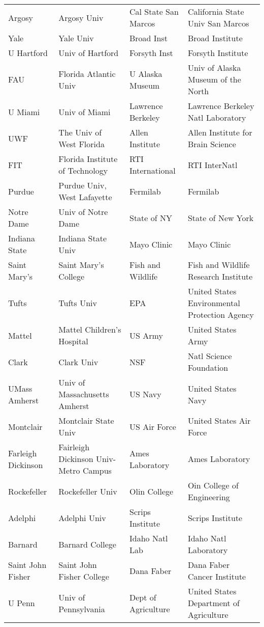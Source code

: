 \documentclass[12pt]{article} %
\begin{document}
\begin{table}[ht]
\begin{adjustwidth}{-2cm}{}
\begin{tabular}{llll}
  Argosy & Argosy Univ & Cal State San Marcos & California State Univ San Marcos \\
  Yale & Yale Univ & Broad Inst & Broad Institute \\
  U Hartford & Univ of Hartford & Forsyth Inst & Forsyth Institute \\
  FAU & Florida Atlantic Univ & U Alaska Museum & Univ of Alaska Museum of the North \\
  U Miami & Univ of Miami & Lawrence Berkeley & Lawrence Berkeley Natl Laboratory \\
  UWF & The Univ of West Florida & Allen Institute & Allen Institute for Brain Science \\
  FIT & Florida Institute of Technology & RTI International & RTI InterNatl \\
  Purdue & Purdue Univ, West Lafayette & Fermilab & Fermilab \\
  Notre Dame & Univ of Notre Dame & State of NY & State of New York \\
  Indiana State & Indiana State Univ & Mayo Clinic & Mayo Clinic \\
  Saint Mary's & Saint Mary's College & Fish and Wildlife & Fish and Wildlife Research Institute \\
  Tufts & Tufts Univ & EPA & United States Environmental Protection Agency \\
  Mattel & Mattel Children's Hospital & US Army & United States Army \\
  Clark & Clark Univ & NSF & Natl Science Foundation \\
  UMass Amherst & Univ of Massachusetts Amherst & US Navy & United States Navy \\
  Montclair & Montclair State Univ & US Air Force & United States Air Force \\
  Farleigh Dickinson & Fairleigh Dickinson Univ-Metro Campus & Ames Laboratory & Ames Laboratory \\
  Rockefeller & Rockefeller Univ & Olin College & Oin College of Engineering \\
  Adelphi & Adelphi Univ & Scrips Institute & Scrips Institute \\
  Barnard & Barnard College & Idaho Natl Lab & Idaho Natl Laboratory \\
  Saint John Fisher & Saint John Fisher College & Dana Faber & Dana Faber Cancer Institute \\
  U Penn & Univ of Pennsylvania & Dept of Agriculture & United States Department of Agriculture \\

\end{tabular}
\end{adjustwidth}
\end{table}
\end{document}
